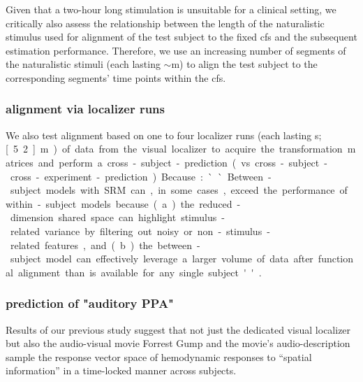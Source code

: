 
Given that a two-hour long stimulation is unsuitable for a clinical setting, we
critically also assess the relationship between the length of the naturalistic
stimulus used for alignment of the test subject to the fixed \ac{cfs} and the
subsequent estimation performance.
%
Therefore, we use an increasing number of segments of the naturalistic stimuli
(each lasting $\sim$\unit[15]{m}) to align the test subject to the corresponding
segments' time points within the \ac{cfs}.





\subsubsection{alignment via localizer runs}


%
We also test alignment based on one to four localizer runs (each lasting
\unit[312]{s}; \unit[5.2]{m}) of data from the visual localizer to acquire the
transformation matrices and perform a cross-subject-prediction (vs.
cross-subject-cross-experiment-prediction).
%
Because: ``Between-subject models with SRM can, in some cases, exceed the
performance of within-subject models because (a) the reduced-dimension shared
space can highlight stimulus-related variance by filtering out noisy or
non-stimulus-related features, and (b) the between-subject model can effectively
leverage a larger volume of data after functional alignment than is available
for any single subject'' \citep{kumar2020brainiak}.


\subsubsection{prediction of "auditory PPA"}


%
Results of our previous study \citep{haeusler2022processing} suggest that not
just the dedicated visual localizer \citep{sengupta2016extension} but also the
audio-visual movie Forrest Gump \citep{hanke2016simultaneous} and the movie's
audio-description \citep{hanke2014audiomovie} sample the response vector space
of hemodynamic responses to ``spatial information'' in a time-locked manner
across subjects.


